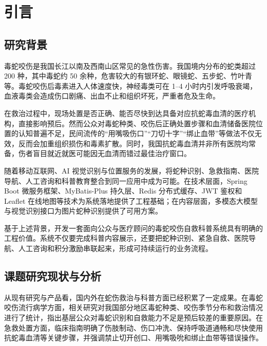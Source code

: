 \documentclass[12pt, a4paper, oneside]{ctexrep}
\begin{document}
\clearpage
{}
{
\tableofcontents
}
\clearpage
\markboth{}{}


\chapter{引言}

\section{研究背景}
毒蛇咬伤是我国长江以南及西南山区常见的急性伤害。我国境内分布的蛇类超过 200 种，其中毒蛇约 50 余种，危害较大的有银环蛇、眼镜蛇、五步蛇、竹叶青等\cite{ref1}。毒蛇咬伤后毒素进入人体速度快，神经毒类可在 1--4 小时内引发呼吸衰竭，血液毒类会造成伤口剧痛、出血不止和组织坏死，严重者危及生命\cite{ref2}。

在救治过程中，现场处置是否正确、能否尽快到达具备对应抗蛇毒血清的医疗机构，直接影响预后。然而公众对毒蛇种类、咬伤后正确处置步骤和血清储备医院位置的认知普遍不足，民间流传的“用嘴吸伤口”“刀切十字”“绑止血带”等做法不仅无效，反而会加重组织损伤和毒素扩散\cite{ref3}。同时，我国抗蛇毒血清并非所有医院均常备，伤者盲目就近就医可能因无血清而错过最佳治疗窗口。

随着移动互联网、AI 视觉识别与位置服务的发展，将蛇种识别、急救指南、医院导航、人工咨询和科普教育整合到同一应用中成为可能。在技术层面，Spring Boot 微服务框架、MyBatis-Plus 持久层、Redis 分布式缓存、JWT 鉴权和 Leaflet 在线地图等技术为系统落地提供了工程基础\cite{ref4,ref7}；在内容层面，多模态大模型与视觉识别接口为图片蛇种识别提供了可用方案\cite{ref5}。

基于上述背景，开发一套面向公众与医疗顾问的毒蛇咬伤自救科普系统具有明确的工程价值。系统不仅要完成科普内容展示，还要把蛇种识别、紧急自救、医院导航、人工咨询和积分激励串联起来，形成可持续运行的业务流程。

\section{课题研究现状与分析}
从现有研究与产品看，国内外在蛇伤救治与科普方面已经积累了一定成果。在毒蛇咬伤流行病学方面，相关研究对我国部分地区毒蛇种类、咬伤季节分布和救治情况进行了统计，指出基层公众对毒蛇识别和自救能力不足是预后较差的重要原因\cite{ref1}。在急救处置方面，临床指南明确了伤肢制动、伤口冲洗、保持呼吸道通畅和尽快使用抗蛇毒血清等关键步骤，并强调禁止切开创口、用嘴吸吮和绑止血带等错误操作\cite{ref2,ref3}。
\end{document}
